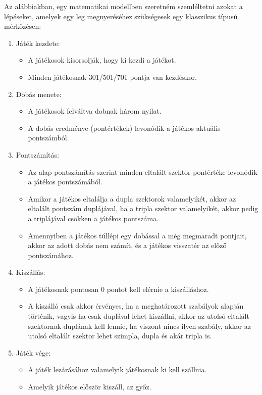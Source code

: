 Az alábbiakban, egy matematikai modellben szeretném szemléltetni azokat a lépéseket, amelyek egy leg megnyeréséhez szükségesek egy klasszikus típusú mérkőzésen:
\begin{enumerate}
\item Játék kezdete:
\begin{itemize}
\item A játékosok kisorsolják, hogy ki kezdi a játékot. 
\item Minden játékosnak 301/501/701 pontja van kezdéskor.
\end{itemize}
\item Dobás menete:
\begin{itemize}
\item A játékosok felváltva dobnak három nyilat.
\item A dobás eredménye (pontértékek) levonódik a játékos aktuális pontszámból.
\end{itemize}
\item Pontszámítás:
\begin{itemize}
\item Az alap pontszámítás szerint minden eltalált szektor pontértéke levonódik a játékos pontszámából.
\item Amikor a játékos eltalálja a dupla szektorok valamelyikét, akkor az eltalált pontszám duplájával, ha a tripla szektor valamelyikét, akkor pedig a triplájával csökken a játékos pontszáma.
\item Amennyiben a játékos túllépi egy dobással a még megmaradt pontjait, akkor az adott dobás nem számít, és a játékos visszatér az előző pontszámához.
\end{itemize}
\item Kiszállás:
\begin{itemize}
\item A játékosnak pontosan 0 pontot kell elérnie a kiszálláshoz.
\item A kiszálló csak akkor érvényes, ha a meghatározott szabályok alapján történik, vagyis ha csak duplával lehet kiszállni, akkor az utolsó eltalált szektornak duplának kell lennie, ha viszont nincs ilyen szabály, akkor az utolsó eltalált szektor lehet szimpla, dupla és akár tripla is.
\end{itemize}
\item Játék vége:
\begin{itemize}
\item A játék lezárásához valamelyik játékosnak ki kell szállnia.
\item Amelyik játékos először kiszáll, az győz.
\end{itemize}
\end{enumerate}


